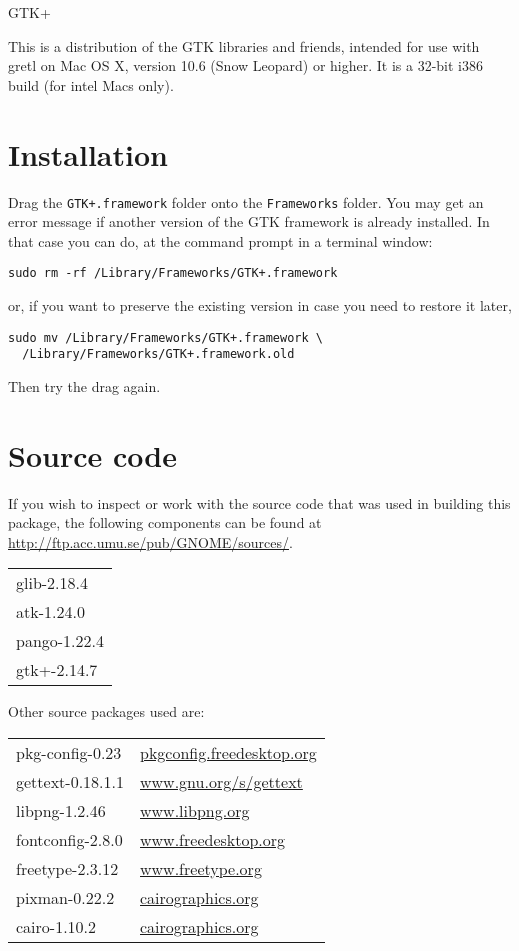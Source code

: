 \documentclass[11pt]{article}
\begin{document}
\thispagestyle{empty}

\begin{center}
{\color{gold} \gtkfont GTK+}
\end{center}

This is a distribution of the GTK libraries and friends, intended for
use with gretl on Mac OS X, version 10.6 (Snow Leopard) or higher.
It is a 32-bit i386 build (for intel Macs only).

\section{Installation}

Drag the \texttt{GTK+.framework} folder onto the \texttt{Frameworks}
folder. You may get an error message if another version of the GTK
framework is already installed. In that case you can do, at the
command prompt in a terminal window:

\verb|sudo rm -rf /Library/Frameworks/GTK+.framework|

or, if you want to preserve the existing version in case you need to
restore it later,
\begin{verbatim}
sudo mv /Library/Frameworks/GTK+.framework \
  /Library/Frameworks/GTK+.framework.old
\end{verbatim}

Then try the drag again.

\section{Source code}

If you wish to inspect or work with the source code that was used in
building this package, the following components can be found at
\url{http://ftp.acc.umu.se/pub/GNOME/sources/}.

\begin{tabular}{l}
glib-2.18.4 \\
atk-1.24.0 \\
pango-1.22.4 \\
gtk+-2.14.7 \\
\end{tabular}

Other source packages used are:

\begin{tabular}{ll}
pkg-config-0.23 & \url{pkgconfig.freedesktop.org} \\
gettext-0.18.1.1 & \url{www.gnu.org/s/gettext} \\
libpng-1.2.46 & \url{www.libpng.org} \\
fontconfig-2.8.0 & \url{www.freedesktop.org} \\
freetype-2.3.12 & \url{www.freetype.org} \\
pixman-0.22.2 & \url{cairographics.org} \\
cairo-1.10.2 & \url{cairographics.org} \\
\end{tabular}
\end{document}
